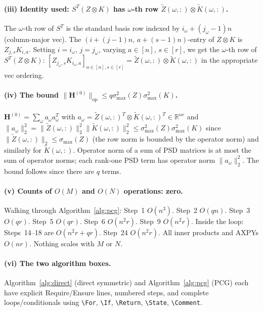 \documentclass[12pt]{article}
\theoremstyle{definition}
\newcommand{\op}{\mathrm{op}}
\newcommand{\R}{\mathbb{R}}
\newcommand{\Kt}{\widetilde{K}}
\newcommand{\Zt}{\widetilde{Z}}
\begin{document}
\paragraph{(iii) Identity used: $S^T(Z\otimes K)$ has $\omega$-th row $\Zt(\omega,:)\otimes\Kt(\omega,:)$.}
The $\omega$-th row of $S^T$ is the standard basis row indexed by $i_\omega+(j_\omega-1)n$
(column-major vec). The $(i+(j-1)n,\,a+(s-1)n)$-entry of $Z\otimes K$ is $Z_{j,s}K_{i,a}$. Setting
$i=i_\omega$, $j=j_\omega$, varying $a\in[n]$, $s\in[r]$, we get the $\omega$-th row of
$S^T(Z\otimes K)$: $[Z_{j_\omega,s}K_{i_\omega,a}]_{a\in[n],s\in[r]}=
\Zt(\omega,:)\otimes\Kt(\omega,:)$ in the appropriate vec ordering. \checkmark

\paragraph{(iv) The bound $\|\mathbf{H}^{(0)}\|_\op\leq q\sigma_{\max}^2(Z)\sigma_{\max}^2(K)$.}
$\mathbf{H}^{(0)}=\sum_\omega a_\omega a_\omega^T$ with
$a_\omega=\Zt(\omega,:)^T\otimes\Kt(\omega,:)^T\in\R^{nr}$ and
$\|a_\omega\|_2^2=\|\Zt(\omega,:)\|_2^2\|\Kt(\omega,:)\|_2^2\leq\sigma_{\max}^2(Z)\sigma_{\max}^2(K)$
since $\|\Zt(\omega,:)\|_2\leq\sigma_{\max}(Z)$ (the row norm is bounded by the operator norm)
and similarly for $\Kt(\omega,:)$. Operator norm of a sum of PSD matrices is at most the sum of
operator norms; each rank-one PSD term has operator norm $\|a_\omega\|_2^2$. The bound follows
since there are $q$ terms. \checkmark

\paragraph{(v) Counts of $O(M)$ and $O(N)$ operations: zero.}
Walking through Algorithm~\ref{alg:pcg}: Step~1 $O(n^3)$. Step~2 $O(qn)$. Step~3 $O(qr)$.
Step~5 $O(qr)$. Step~6 $O(n^2 r)$. Step~9 $O(n^2 r)$. Inside the loop: Steps~14--18 are
$O(n^2 r+qr)$. Step~24 $O(n^2 r)$. All inner products and AXPYs $O(nr)$. Nothing scales with $M$
or $N$. \checkmark

\paragraph{(vi) The two algorithm boxes.}
Algorithm~\ref{alg:direct} (direct symmetric) and Algorithm~\ref{alg:pcg} (PCG) each have
explicit Require/Ensure lines, numbered steps, and complete loops/conditionals using
\verb|\For|, \verb|\If|, \verb|\Return|, \verb|\State|, \verb|\Comment|. \checkmark
\end{document}
